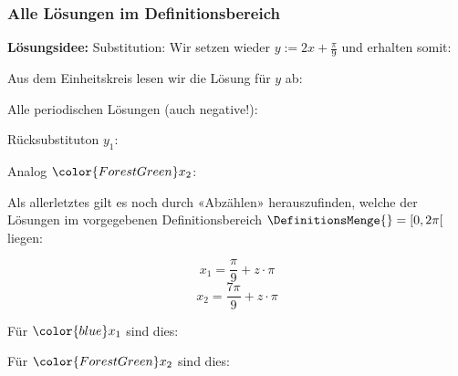 \subsubsection{Alle Lösungen im Definitionsbereich}
\textbf{Lösungsidee:} Substitution:
Wir setzen wieder $y := 2x + \frac{\pi}{9}$ und erhalten somit:



Aus dem Einheitskreis lesen wir die Lösung für $y$ ab:




Alle periodischen Lösungen (auch negative!):



Rücksubstituton $y_1$:

Analog ${\color{ForestGreen}x_2}$:


Als allerletztes gilt es noch durch «Abzählen» herauszufinden, welche
der Lösungen im vorgegebenen Definitionsbereich $\DefinitionsMenge{} =
[0, 2\pi[$ liegen:

    $$x_1= \frac\pi9 + z\cdot{}\pi$$
    $$x_2= \frac{7\pi}9 + z\cdot{}\pi$$

    Für ${\color{blue}x_1}$ sind dies:


    
      \vspace{5mm}
      
      Für ${\color{ForestGreen}x_2}$ sind dies:


